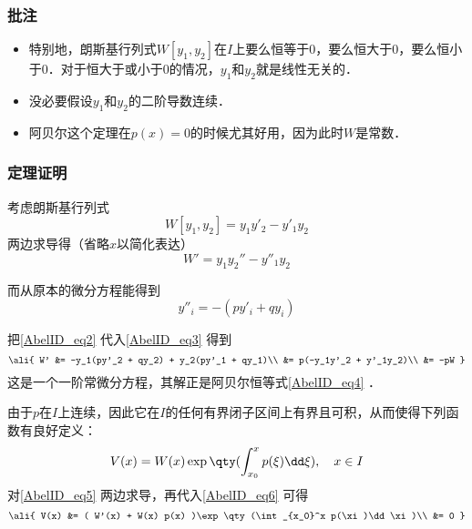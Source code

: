 \subsubsection{批注}

\begin{itemize}
\item 特别地，朗斯基行列式$W[y_1, y_2]$在$I$上要么恒等于$0$，要么恒大于$0$，要么恒小于$0$．对于恒大于或小于$0$的情况，$y_1$和$y_2$就是线性无关的．
\item 没必要假设$y_1$和$y_2$的二阶导数连续．
\item 阿贝尔这个定理在$p(x)=0$的时候尤其好用，因为此时$W$是常数．
\end{itemize}


\subsubsection{定理证明}

考虑朗斯基行列式
\begin{equation}
W[y_1, y_2] = y_1y'_2 - y'_1y_2
\end{equation}
两边求导得（省略$x$以简化表达）
\begin{equation}\label{AbelID_eq3}
W' = y_1y_2'' - y''_1y_2
\end{equation}

而从原本的微分方程能得到
\begin{equation}\label{AbelID_eq2}
y''_i = -(py'_i+qy_i)
\end{equation}

把\autoref{AbelID_eq2} 代入\autoref{AbelID_eq3} 得到
\begin{equation}\label{AbelID_eq6}
\ali{
    W' &= -y_1(py'_2 + qy_2) + y_2(py'_1 + qy_1)\\
    &= p(-y_1y'_2 + y'_1y_2)\\
    &= -pW
}
\end{equation}
这是一个一阶常微分方程，其解正是阿贝尔恒等式\autoref{AbelID_eq4} ．

由于$p$在$I$上连续，因此它在$I$的任何有界闭子区间上有界且可积，从而使得下列函数有良好定义：
\begin{equation}\label{AbelID_eq5}
V(x) = W(x) \exp\qty(\int_{x_0}^x p(\xi)\dd \xi),\quad x\in I
\end{equation}
对\autoref{AbelID_eq5} 两边求导，再代入\autoref{AbelID_eq6} 可得
\begin{equation}
\ali{
    V(x) &= ( W'(x) + W(x) p(x) )\exp\qty(\int_{x_0}^x p(\xi)\dd \xi)\\
    &= 0
}
\end{equation}

